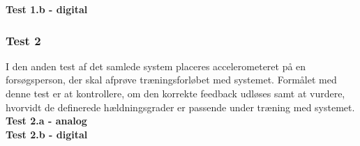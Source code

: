 \noindent\textbf{Test 1.b -  digital}\\ 

\subsubsection{Test 2}
I den anden test af det samlede system placeres accelerometeret på en forsøgsperson, der skal afprøve træningsforløbet med systemet. Formålet med denne test er at kontrollere, om den korrekte feedback udløses samt at vurdere, hvorvidt de definerede hældningsgrader er passende under træning med systemet. \\ 
\textbf{Test 2.a - analog}\\  
\textbf{Test 2.b - digital}\\ 